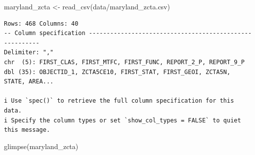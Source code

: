\documentclass[
  letterpaper,
  DIV=11,
  numbers=noendperiod]{scrreprt}
\newenvironment{Shaded}{\begin{snugshade}}{\end{snugshade}}
\newcommand{\FunctionTok}[1]{\textcolor[rgb]{0.28,0.35,0.67}{#1}}
\newcommand{\NormalTok}[1]{\textcolor[rgb]{0.00,0.23,0.31}{#1}}
\newcommand{\OtherTok}[1]{\textcolor[rgb]{0.00,0.23,0.31}{#1}}
\newcommand{\StringTok}[1]{\textcolor[rgb]{0.13,0.47,0.30}{#1}}
\begin{document}
\begin{Shaded}
\begin{Highlighting}[]
\NormalTok{maryland\_zcta }\OtherTok{\textless{}{-}} \FunctionTok{read\_csv}\NormalTok{(}\StringTok{\textquotesingle{}data/maryland\_zcta.csv\textquotesingle{}}\NormalTok{)}
\end{Highlighting}
\end{Shaded}

\begin{verbatim}
Rows: 468 Columns: 40
-- Column specification --------------------------------------------------------
Delimiter: ","
chr  (5): FIRST_CLAS, FIRST_MTFC, FIRST_FUNC, REPORT_2_P, REPORT_9_P
dbl (35): OBJECTID_1, ZCTA5CE10, FIRST_STAT, FIRST_GEOI, ZCTA5N, STATE, AREA...

i Use `spec()` to retrieve the full column specification for this data.
i Specify the column types or set `show_col_types = FALSE` to quiet this message.
\end{verbatim}

\begin{Shaded}
\begin{Highlighting}[]
\FunctionTok{glimpse}\NormalTok{(maryland\_zcta)}
\end{Highlighting}
\end{Shaded}
\end{document}

